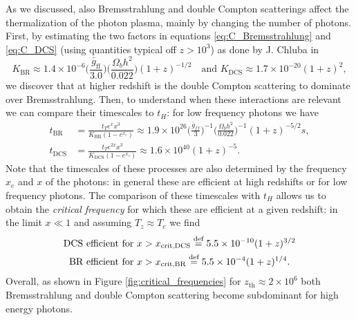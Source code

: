 As we discussed, also Bremsstrahlung and double Compton scatterings affect the thermalization of the photon plasma, mainly by changing the number of photons. First, by estimating the two factors in equations \eqref{eq:C_Bremsstrahlung} and \eqref{eq:C_DCS} (using quantities typical off $z>10^3$) as done by J. Chluba in \cite{chlubafuturestepscosmologyusing}
$$K_\text{BR}\approx1.4\times10^{-6}\bigg(\frac{\bar{g}_\text{ff}}{3.0}\bigg)\bigg(\frac{\Omega_b h^2}{0.022}\bigg)(1+z)^{-1/2}\quad\text{and }K_\text{DCS}\approx1.7\times10^{-20}(1+z)^2,$$ we discover that at higher redshift is the double Compton scattering to dominate over Bremsstrahlung. Then, to understand when these interactions are relevant we can compare their timescales to $t_H$: for low frequency photons we have
\begin{align*}
    t_{\text{BR}}&=\frac{t_Te^{x}x^3}{K_\text{BR}(1-e^{x_e})}\approx1.9\times10^{26}\bigg(\frac{\bar{g}_{ff}}{3}\bigg)^{-1}\bigg(\frac{\Omega_bh^2}{0.022}\bigg)^{-1}(1+z)^{-5/2}s,\\
    t_{\text{DCS}}&=\frac{t_Te^{2x}x^3}{K_\text{DCS}(1-e^{x_e})}\approx1.6\times10^{40}(1+z)^{-5}.
\end{align*}
Note that the timescales of these processes are also determined by the frequency $x_e$ and $x$ of the photons: in general these are efficient at high redshifts or for low frequency photons. The comparison of these timescales with $t_H$ allows us to obtain the \emph{critical frequency} for which these are efficient at a given redshift: in the limit $x\ll1$ and assuming $T_z\approx T_e$ we find
\begin{align*}
    \text{DCS efficient for }x&>x_{\text{crit,DCS}}\stackrel{\text{def}}{=}5.5\times10^{-10}(1+z)^{3/2}\\
    \text{BR efficient for }x&>x_{\text{crit,BR}}\stackrel{\text{def}}{=}5.5\times10^{-4}(1+z)^{1/4}.
\end{align*}  
Overall, as shown in Figure \ref{fig:critical_frequencies} for $z_{\text{th}}\approx2\times10^6$ both Bremsstrahlung and double Compton scattering become subdominant for high energy photons.\newpage

